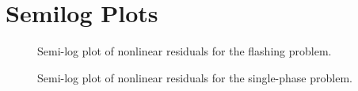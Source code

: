 \chapter{Semilog Plots}
\label{app:semilog}

\begin{figure}[h!t]
\centering
{}
\caption[Semi-log plot of nonlinear residuals for the flashing problem.]{Semi-log plot of nonlinear residuals for the flashing problem.}
\label{fig:flashing_semilog_plots}
\end{figure}

\begin{figure}[h!t]
\centering
{}
\caption[Semi-log plot of nonlinear residuals for the single-phase problem.]{Semi-log plot of nonlinear residuals for the single-phase problem.}
\label{fig:single_semilog_plots}
\end{figure}